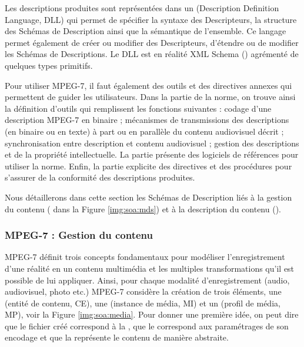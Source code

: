Les descriptions produites sont représentées dans un  (Description Definition Language, DLL) qui permet de spécifier la syntaxe des Descripteurs, la structure des Schémas de Description ainsi que la sémantique de l'ensemble.
Ce langage permet également de créer ou modifier des Descripteurs, d'étendre ou de modifier les Schémas de Descriptions. 
Le DLL est en réalité XML Schema (\cite{Fallside2004}) agrémenté de quelques types primitifs.

Pour utiliser MPEG-7, il faut également des outils et des directives annexes qui permettent de guider les utilisateurs. 
Dans la partie  de la norme, on trouve ainsi la définition d'outils qui remplissent les fonctions suivantes : codage d'une description MPEG-7 en binaire ; mécanismes de transmissions des descriptions (en binaire ou en texte) à part ou en parallèle du contenu audiovisuel décrit ;  synchronisation entre description et contenu audiovisuel ; gestion des descriptions et de la propriété intellectuelle. 
La partie  présente des logiciels de références pour utiliser la norme.
Enfin, la partie  explicite des directives et des procédures pour s'assurer de la conformité des descriptions produites.

Nous détaillerons dans cette section les Schémas de Description liés à la gestion du contenu ( dans la Figure \ref{img:soa:mds}) et à la description du contenu ().\\


\subsubsection{MPEG-7 : Gestion du contenu}
MPEG-7 définit trois concepts fondamentaux pour modéliser l'enregistrement d'une réalité en un contenu multimédia et les multiples transformations qu'il est possible de lui appliquer. 
Ainsi, pour chaque modalité d'enregistrement (audio, audiovisuel, photo etc.) MPEG-7 considère la création de trois éléments, une  (entité de contenu, CE), une  (instance de média, MI) et un  (profil de média, MP), voir la Figure \ref{img:soa:media}.
Pour donner une première idée, on peut dire que le fichier créé correspond à la , que le  correspond aux paramétrages de son encodage et que la  représente le contenu de manière abstraite.

